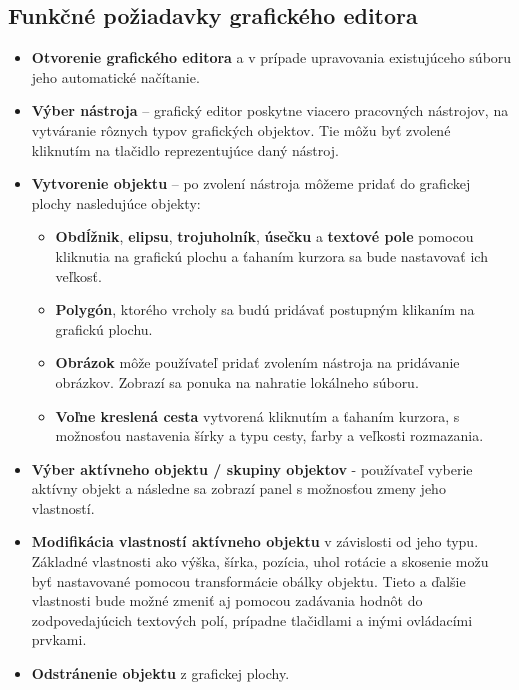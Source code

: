 \subsection{Funkčné požiadavky grafického editora}
\begin{itemize}
	\item \textbf{Otvorenie grafického editora} a v prípade upravovania existujúceho súboru jeho automatické načítanie.
	
	\item \textbf{Výber nástroja} -- grafický editor poskytne viacero pracovných nástrojov, na vytváranie rôznych typov grafických objektov. Tie môžu byť zvolené kliknutím na tlačidlo reprezentujúce daný nástroj. 
	
	\item \textbf{Vytvorenie objektu} -- po zvolení nástroja môžeme pridať do grafickej plochy nasledujúce objekty:
	\begin{itemize}
		\item \textbf{Obdĺžnik}, \textbf{elipsu}, \textbf{trojuholník}, \textbf{úsečku} a \textbf{textové pole} pomocou kliknutia na grafickú plochu a  ťahaním kurzora sa bude nastavovať ich veľkosť.
		\item \textbf{Polygón}, ktorého vrcholy sa budú pridávať postupným klikaním na grafickú plochu.
		\item \textbf{Obrázok} môže používateľ pridať zvolením nástroja na pridávanie obrázkov. Zobrazí sa ponuka na nahratie lokálneho súboru.
		\item \textbf{Voľne kreslená cesta} vytvorená kliknutím a ťahaním kurzora, s možnosťou nastavenia šírky a typu cesty, farby a veľkosti rozmazania.
	\end{itemize}
	
	\item \textbf{Výber aktívneho objektu / skupiny objektov} - používateľ vyberie aktívny objekt a následne sa zobrazí panel s možnosťou zmeny jeho vlastností.
	
	\item \textbf{Modifikácia vlastností aktívneho objektu} v závislosti od jeho typu. Základné vlastnosti ako výška, šírka, pozícia, uhol rotácie a skosenie možu byť nastavované pomocou transformácie obálky objektu. Tieto a ďalšie vlastnosti bude možné zmeniť aj pomocou zadávania hodnôt do zodpovedajúcich textových polí, prípadne tlačidlami a inými ovládacími prvkami.
	
	\item \textbf{Odstránenie objektu} z grafickej plochy. 
	

\end{itemize}
